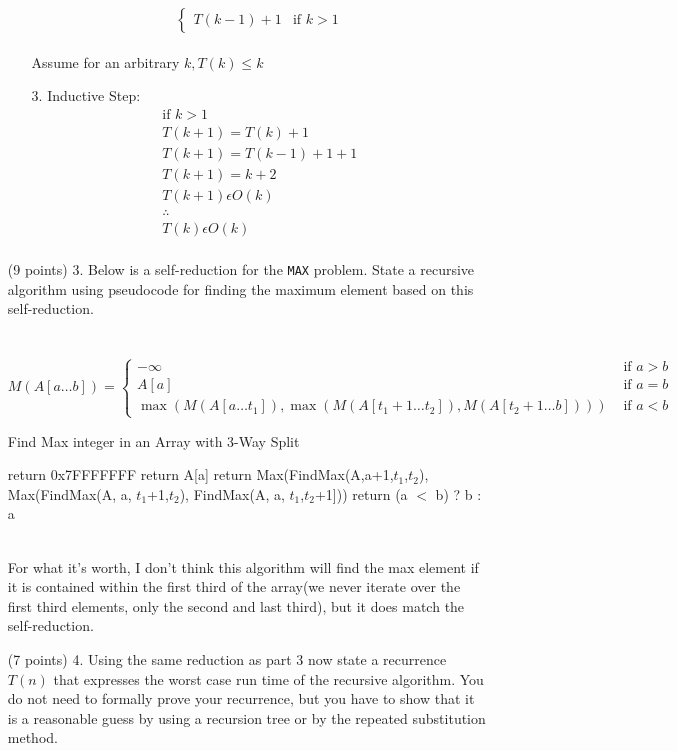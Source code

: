 \documentclass[paper=a4,fontsize=11pt]{article}
\begin{document}
\begin{enumerate}
\begin{enumerate}
\[\begin{cases}
        T(k-1) + 1 & \text{if $k > 1$}
    \end{cases}
\]
\\Assume for an arbitrary $k, T(k) \leq k$
\item[3.] Inductive Step:
\begin{gather*}
\text{if $k > 1$}\\
T(k + 1) = T(k) + 1\\
T(k + 1) = T(k - 1) + 1 + 1\\  
T(k + 1) = k + 2\\
T(k + 1) \epsilon O(k)\\
\therefore\\
T(k) \epsilon O(k)\\
\end{gather*}
\end{enumerate}
\item [(9 points) 3.] Below is a self-reduction for the \texttt{MAX} problem. State a recursive algorithm using pseudocode for finding the maximum element based on this self-reduction.\\\\\
\[
M(A[a\dots b]) = \left\{
\begin{array}{cl}
-\infty & \textrm{ if } a > b\\
A[a] & \textrm{ if } a = b\\
\max(M(A[a\dots t_1]), \max(M(A[t_1+1\dots t_2]), M(A[t_2+1\dots b]))) & \textrm{ if } a < b
\end{array}
\right.
\]
\begin{algorithm}
\caption{Find Max integer in an Array with 3-Way Split}
\label{array-max}
\begin{algorithmic}[1]
        \State return 0x7FFFFFFF
        \State return A[a]
        \State return Max(FindMax(A,a+1,$t_1$,$t_2$), Max(FindMax(A, a, $t_1$+1,$t_2$), FindMax(A, a, $t_1$,$t_2$+1]))
    \EndIf
\EndProcedure
{}
    return (a $<$ b) ? b : a
\EndProcedure
\end{algorithmic}
\end{algorithm}\\
For what it's worth, I don't think this algorithm will find the max element if it is contained within the first third of the array(we never iterate over the first third elements, only the second and last third), but it does match the self-reduction.
\item [(7 points) 4.] Using the same reduction as part 3 now state a recurrence $T(n)$ that expresses the worst case run time of the recursive algorithm. You do not need to formally prove your recurrence, but you have to show that it is a reasonable guess by using a recursion tree or by the repeated substitution method.

\end{enumerate}
\end{document}
